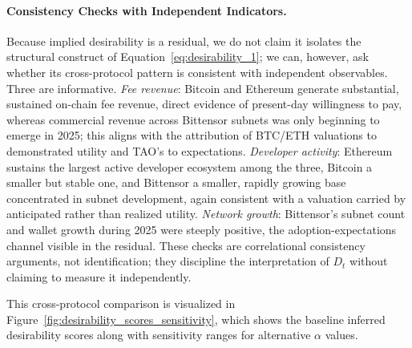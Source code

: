 \documentclass[12pt]{article}
\begin{document}
\paragraph{Consistency Checks with Independent Indicators.}
Because implied desirability is a residual, we do not claim it isolates the structural construct of Equation~\eqref{eq:desirability_1}; we can, however, ask whether its cross-protocol pattern is consistent with independent observables. Three are informative. \textit{Fee revenue}: Bitcoin and Ethereum generate substantial, sustained on-chain fee revenue, direct evidence of present-day willingness to pay, whereas commercial revenue across Bittensor subnets was only beginning to emerge in 2025; this aligns with the attribution of BTC/ETH valuations to demonstrated utility and TAO's to expectations. \textit{Developer activity}: Ethereum sustains the largest active developer ecosystem among the three, Bitcoin a smaller but stable one, and Bittensor a smaller, rapidly growing base concentrated in subnet development, again consistent with a valuation carried by anticipated rather than realized utility. \textit{Network growth}: Bittensor's subnet count and wallet growth during 2025 were steeply positive, the adoption-expectations channel visible in the residual. These checks are correlational consistency arguments, not identification; they discipline the interpretation of \( D_t \) without claiming to measure it independently.

This cross-protocol comparison is visualized in 
Figure~\ref{fig:desirability_scores_sensitivity}, which shows the baseline 
inferred desirability scores along with sensitivity ranges for alternative 
$\alpha$ values.
\end{document}
